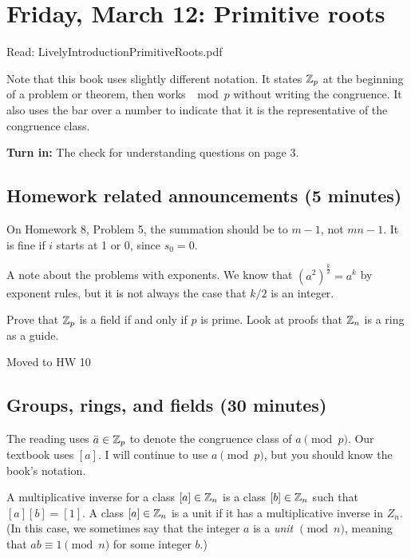 \documentclass[letterpaper, 11 pt]{article}
\begin{document}
\section{Friday, March 12: Primitive roots}

Read: LivelyIntroductionPrimitiveRoots.pdf

Note that this book uses slightly different notation. It states $\mathbb Z_p$ at the beginning of a problem or theorem, then works $\mod p$ without writing the congruence. It also uses the bar over a number to indicate that it is the representative of the congruence class.

{\bf Turn in:} The check for understanding questions on page 3.
\subsection{Homework related announcements (5 minutes)}

On Homework 8, Problem 5, the summation should be to $m-1$, not $mn-1$. It is fine if $i$ starts at 1 or 0, since $s_0=0$.

A note about the problems with exponents. We know that $(a^2)^{\frac{k}{2}}=a^k$ by exponent rules, but it is not always the case that $k/2$ is an integer.

Prove that $\mathbb Z_p$ is a field if and only if $p$ is prime. Look at proofs that $\mathbb Z_n$ is a ring as a guide.

Moved to HW 10

\subsection{Groups, rings, and fields (30 minutes)}
The reading uses $\bar a\in\mathbb Z_p$ to denote the congruence class of $a \pmod p$. Our textbook uses $[a]$. I will continue to use $a\pmod p$, but you should know the book's notation.

\begin{defn}
 A multiplicative inverse for a class $[a]\in\mathbb Z_n$ is a class $[b]\in\mathbb Z_n$ such that $[a][b] = [1]$. A class $[a]\in\mathbb Z_n$ is a unit if it has a multiplicative inverse in $Z_n$. (In this case, we sometimes say that the integer $a$ is a \emph{unit $\pmod n$}, meaning that $ab \equiv 1 \pmod n$ for some integer $b.$)
\end{defn}
\end{document}
